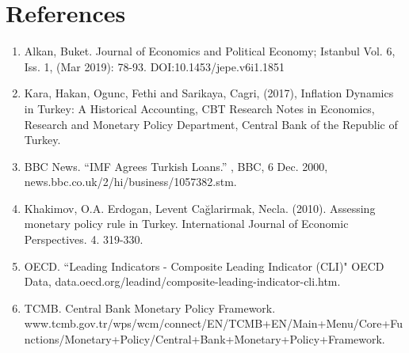 \documentclass{article}
\begin{document}
\newpage
\section{References}

    \begin{enumerate}
    
        \item Alkan, Buket. Journal of Economics and Political Economy; Istanbul Vol. 6, Iss. 1,  (Mar 2019): 78-93. DOI:10.1453/jepe.v6i1.1851 
        \item Kara, Hakan, Ogunc, Fethi and Sarikaya, Cagri, (2017), Inflation Dynamics in Turkey: A Historical Accounting, CBT Research Notes in Economics, Research and Monetary Policy Department, Central Bank of the Republic of Turkey.
        \item BBC News. “IMF Agrees Turkish Loans.” , BBC, 6 Dec. 2000, news.bbc.co.uk/2/hi/business/1057382.stm. 
        \item Khakimov, O.A. Erdogan, Levent Cağlarirmak, Necla. (2010). Assessing monetary policy rule in Turkey. International Journal of Economic Perspectives. 4. 319-330.
        \item OECD. “Leading Indicators - Composite Leading Indicator (CLI)" OECD Data, data.oecd.org/leadind/composite-leading-indicator-cli.htm. 
        \item TCMB. Central Bank Monetary Policy Framework.\\ www.tcmb.gov.tr/wps/wcm/connect/EN/TCMB+EN/Main+Menu/Core+Functions/Monetary+Policy/Central+Bank+Monetary+Policy+Framework. 


    \end{enumerate}
\end{document}
